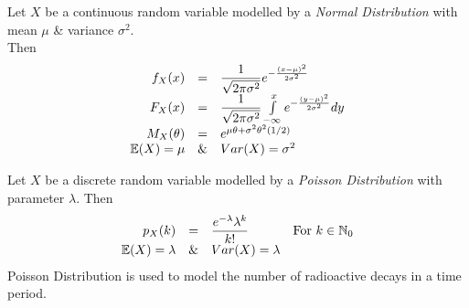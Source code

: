 \documentclass[11pt,a4paper]{article}
\begin{document}
Let $X$ be a continuous random variable modelled by a \textit{Normal Distribution} with mean $\mu$ \& variance $\sigma^2$.\\
Then
\[\begin{array}{rcl}
f_X(x)&=&\dfrac{1}{\sqrt{2\pi\sigma^2}}e^{-\frac{(x-\mu)^2}{2\sigma^2}}\\
F_X(x)&=&\dfrac{1}{\sqrt{2\pi\sigma^2}}\int\limits_{-\infty}^xe^{-\frac{(y-\mu)^2}{2\sigma^2}}dy\\
M_X(\theta)&=&e^{\mu\theta+\sigma^2\theta^2(1/2)}\\
\mathbb{E}(X)=\mu&\&&Var(X)=\sigma^2
\end{array}\]

Let $X$ be a discrete random variable modelled by a \textit{Poisson Distribution} with parameter $\lambda$. Then
\[\begin{array}{rcll}
p_X(k)&=&\dfrac{e^{-\lambda}\lambda^k}{k!}&\mathrm{For\ }k\in\nats_0\\
\expect(X)=\lambda&\&&Var(X)=\lambda
\end{array}\]
\nb Poisson Distribution is used to model the number of radioactive decays in a time period.\\
\end{document}

